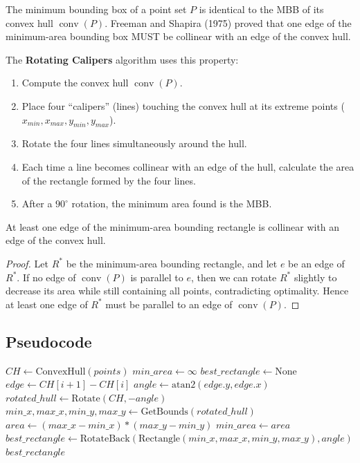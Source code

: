 The minimum bounding box of a point set $P$ is identical to the MBB of its convex hull $\operatorname{conv}(P)$. Freeman and Shapira (1975) proved that one edge of the minimum-area bounding box MUST be collinear with an edge of the convex hull.

The \textbf{Rotating Calipers} algorithm uses this property:
\begin{enumerate}
\item Compute the convex hull $\operatorname{conv}(P)$.
\item Place four ``calipers'' (lines) touching the convex hull at its extreme points ($x_{min}, x_{max}, y_{min}, y_{max}$).
\item Rotate the four lines simultaneously around the hull.
\item Each time a line becomes collinear with an edge of the hull, calculate the area of the rectangle formed by the four lines.
\item After a $90^\circ$ rotation, the minimum area found is the MBB.
\end{enumerate}

\begin{theorem}\label{thm:rc_correctness}
At least one edge of the minimum-area bounding rectangle is collinear with an edge of the convex hull.
\end{theorem}
\begin{proof}
Let $R^*$ be the minimum-area bounding rectangle, and let $e$ be an edge of $R^*$. If no edge of $\operatorname{conv}(P)$ is parallel to $e$, then we can rotate $R^*$ slightly to decrease its area while still containing all points, contradicting optimality. Hence at least one edge of $R^*$ must be parallel to an edge of $\operatorname{conv}(P)$.
\end{proof}

\subsection{Pseudocode}

\begin{algorithm}[htbp]
\caption{Minimum Bounding Box via Rotating Calipers}
\label{alg:min_bounding_box}
\begin{algorithmic}[1]
  \State $CH \gets \text{ConvexHull}(points)$
  \State $min\_area \gets \infty$
  \State $best\_rectangle \gets \text{None}$
    \State $edge \gets CH[i+1] - CH[i]$
    \State $angle \gets \text{atan2}(edge.y, edge.x)$
    \State $rotated\_hull \gets \text{Rotate}(CH, -angle)$
    \State $min\_x, max\_x, min\_y, max\_y \gets \text{GetBounds}(rotated\_hull)$
    \State $area \gets (max\_x - min\_x) * (max\_y - min\_y)$
      \State $min\_area \gets area$
      \State $best\_rectangle \gets \text{RotateBack}(\text{Rectangle}(min\_x, max\_x, min\_y, max\_y), angle)$
    \EndIf
  \EndFor
  \State \Return $best\_rectangle$
\EndFunction
\end{algorithmic}
\end{algorithm}

